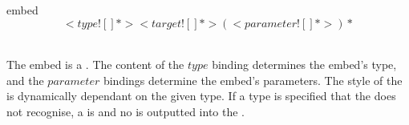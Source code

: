 \begin{identifier}{embed}
\[<type ![ ]*> <target ![ ]*>( <parameter ![ ]*>)*\]
\end{identifier}
 \\

The embed is a . The content of the \inline$type$ binding determines the embed's type, and the \inline$parameter$ bindings determine the embed's parameters. The style of the  is dynamically dependant on the given type. If a type is specified that the  does not recognise, a  is  and no  is outputted into the . \\




